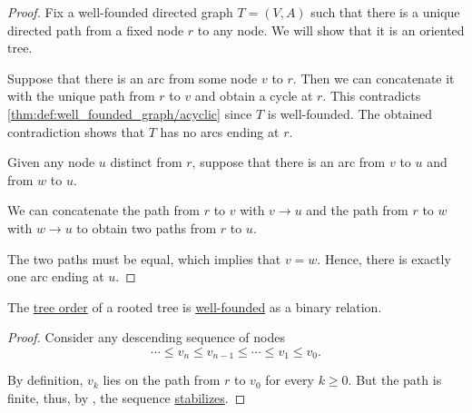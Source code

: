 \begin{proof}
  \NecessitySubProof Fix a well-founded directed graph \( T = (V, A) \) such that there is a unique directed path from a fixed node \( r \) to any node. We will show that it is an oriented tree.

   Suppose that there is an arc from some node \( v \) to \( r \). Then we can concatenate it with the unique path from \( r \) to \( v \) and obtain a cycle at \( r \). This contradicts \cref{thm:def:well_founded_graph/acyclic} since \( T \) is well-founded. The obtained contradiction shows that \( T \) has no arcs ending at \( r \).

   Given any node \( u \) distinct from \( r \), suppose that there is an arc from \( v \) to \( u \) and from \( w \) to \( u \).

  We can concatenate the path from \( r \) to \( v \) with \( v \to u \) and the path from \( r \) to \( w \) with \( w \to u \) to obtain two paths from \( r \) to \( u \).

  The two paths must be equal, which implies that \( v = w \). Hence, there is exactly one arc ending at \( u \).
\end{proof}

\begin{lemma}\label{thm:tree_order_well_founded}
  The \hyperref[def:rooted_tree/order]{tree order} of a rooted tree is \hyperref[def:well_founded_relation]{well-founded} as a binary relation.
\end{lemma}
\begin{proof}
  Consider any descending sequence of nodes
  \begin{equation*}
    \cdots \leq v_n \leq v_{n-1} \leq \cdots \leq v_1 \leq v_0.
  \end{equation*}

  By definition, \( v_k \) lies on the path from \( r \) to \( v_0 \) for every \( k \geq 0 \). But the path is finite, thus, by , the sequence \hyperref[def:stabilizing_sequence]{stabilizes}.
\end{proof}

